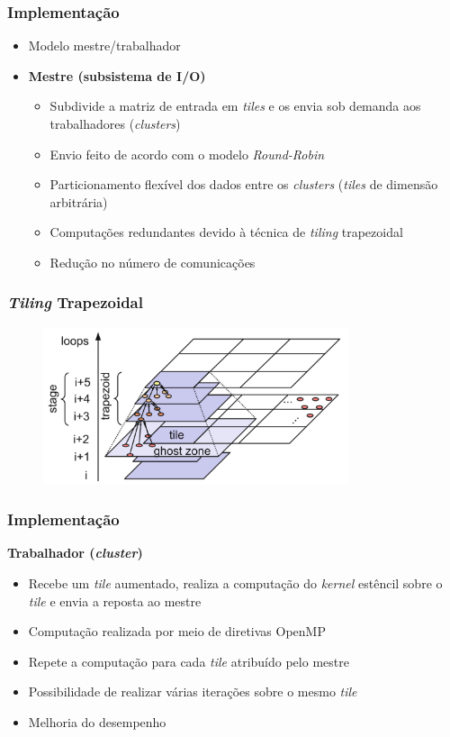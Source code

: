 \documentclass[xcolor={table}]{beamer}
\begin{document}
\begin{frame}\frametitle{Implementação}
    \begin{itemize}
        \item {Modelo mestre/trabalhador}
        \item \textbf{Mestre (subsistema de I/O)}
            \begin{itemize}
                \item {Subdivide a matriz de entrada em \textit{tiles} e os envia sob demanda aos trabalhadores (\textit{clusters})}
                \item {Envio feito de acordo com o modelo \textit{Round-Robin}}
                \item {Particionamento flexível dos dados entre os \textit{clusters} (\textit{tiles} de dimensão arbitrária)}
                \item {Computações redundantes devido à técnica de \textit{tiling} trapezoidal}
                \item {Redução no número de comunicações}
            \end{itemize}
    \end{itemize}
\end{frame}

\begin{frame}\frametitle{\textit{Tiling} Trapezoidal}
    \begin{figure}[t]
        \centering
        \includegraphics[width=0.80\textwidth]{tiling.pdf}
    \end{figure}
\end{frame}

\begin{frame}\frametitle{Implementação}
    \textbf{Trabalhador (\textit{cluster})}
    \begin{itemize}
        \item {Recebe um \textit{tile} aumentado, realiza a computação do \textit{kernel} estêncil sobre o \textit{tile} e envia a reposta ao mestre}
            \item {Computação realizada por meio de diretivas OpenMP}
        \item {Repete a computação para cada \textit{tile} atribuído pelo mestre}
        \item {Possibilidade de realizar várias iterações sobre o mesmo \textit{tile}}
        \item {Melhoria do desempenho}
    \end{itemize}
\end{frame}
\end{document}
